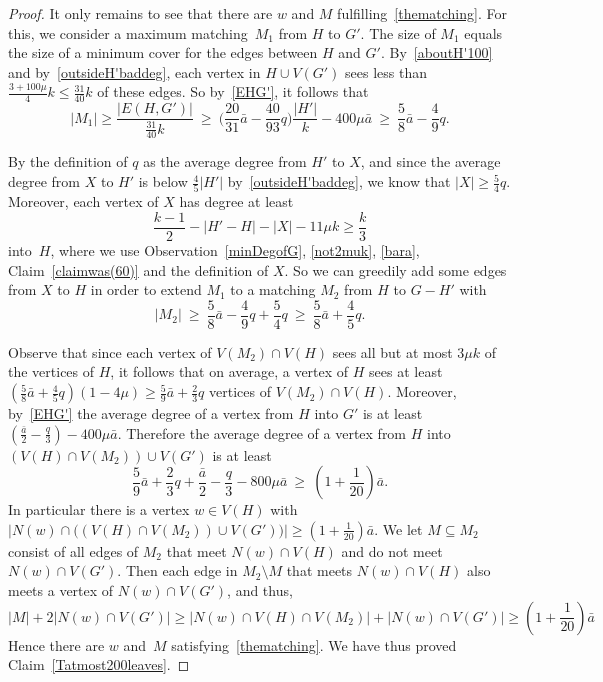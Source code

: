 \documentclass[12pt]{article}
\begin{document}
\begin{proof}
It only remains to see that there are $w$ and $M$ fulfilling~\eqref{thematching}. For this, we consider a maximum matching~$M_1$ from $H$ to $G'$. The size of $M_1$ equals the size of a minimum cover for the
edges  between $H$ and $G'$. By~\eqref{aboutH'100}  and by~\eqref{outsideH'baddeg}, each vertex in $H\cup V(G')$ sees less than  $\frac{3+100\mu}{4}k\le \frac{31}{40}k$ of these edges. So by~\eqref{EHG'}, it follows that 
$$|M_1|\ge \frac{|E(H,G')|}{ \frac{31}{40}k}\ \ge \
\Big( \frac{20}{31}\bar a  - \frac{40}{93} q \Big)\frac{|H'|}k- 400 \mu \bar a 
\ \ge\ \frac{5}{8} \bar a-\frac 49 q.$$

By the definition of $q$ as the average degree from $H'$ to $X$, and since the average degree from $X$ to $H'$ is below $ \frac 45|H'|$ by~\eqref{outsideH'baddeg}, we know that $|X|\ge \frac 54q$. Moreover, each vertex of $X$ has degree at least $$\frac{k-1}2-|H'-H|-|X| - 11\mu k \ge \frac k3$$ into~$H$, where we use  Observation~\ref{minDegofG},  \eqref{not2muk}, \eqref{bara}, Claim~\ref{claimwas(60)}  and the definition of $X$.
So we can greedily add some edges from $X$ to $H$ in order to  extend $M_1$ to a matching $M_2$ from $H$ to $G-H'$ with $$|M_2|\ \ge \ \frac 58 \bar a-\frac 49 q+\frac 54 q\ \ge \ \frac 58 \bar a+\frac 45 q.$$

Observe that since each vertex of $V(M_2)\cap V(H)$ sees all but at most $3\mu k$ of the vertices of $H$, it follows that 
on average, a vertex of $H$ sees at least $(\frac 58 \bar a+\frac 45 q)(1-4\mu)\ge  \frac 59 \bar a+ \frac 23 q$ vertices of  $V(M_2)\cap V(H)$. 
Moreover, by~\eqref{EHG'} the average 
degree of a vertex from $H$ into $G'$ is at least 
 $(\frac{\bar a}2 -\frac q3) -400 \mu\bar a$. 
Therefore  the average 
degree of a vertex from $H$ into $ ( V(H) \cap V(M_2))\cup V(G')$   is at least  
$$ \frac 59 \bar a+ \frac 23 q + \frac{\bar a}2 -\frac q3 -800 \mu\bar a \ \ge\ ( 1 + \frac 1{20})\bar a.$$
In particular there is a vertex $w\in V(H)$ with $|N(w)\cap \big ((V(H)\cap V(M_2))\cup V(G') \big)|\ge (1 + \frac 1{20})\bar a$. We let $M\subseteq M_2$ consist of all edges of $M_2$ that meet $N(w)\cap V(H)$ and do not meet $N(w)\cap V(G')$. Then  each  edge in $M_2\setminus M$ that meets $N(w)\cap V(H)$ also meets
  a vertex of $N(w)\cap V(G')$, and thus,
$$|M|+2|N(w)\cap V(G')|\ge 
|N(w)\cap V(H)\cap V(M_2)|+|N(w)\cap V(G')|\ge
(1 + \frac 1{20})\bar a$$ 
Hence there are $w$ and~$M$ satisfying~\eqref{thematching}.
We have thus proved Claim~\ref{Tatmost200leaves}.
                      \end{proof}
\end{document}
